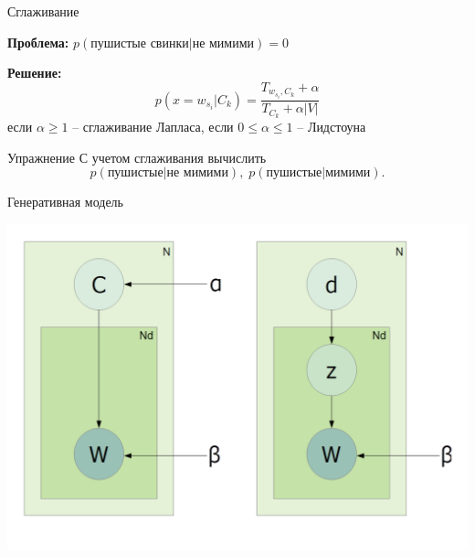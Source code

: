 \documentclass[aspectratio=169]{beamer}
\begin{document}
\begin{frame}{Сглаживание}

{\bf Проблема:} $p(\text{пушистые свинки}|\text{не мимими}) = 0$

\vspace{1em}
{\bf Решение:}
\[
p(x = w_{s_i} | C_k) = \frac{T_{w_{s_i}, C_k} + \alpha}{T_{C_k} + \alpha |V|}
\]
если $\alpha \geq 1$ -- сглаживание Лапласа, если $0 \leq \alpha \leq 1$ -- Лидстоуна

\vspace{1em}
\begin{exampleblock}{Упражнение}
С учетом сглаживания вычислить 
\[
p(\text{пушистые}|\text{не мимими}), \; p(\text{пушистые}|\text{мимими}).
\]
\end{exampleblock}

\end{frame}


\begin{frame}{Генеративная модель}

\begin{center}
\includegraphics[scale=0.3]{images/lsa.png}
\end{center}

\end{frame}

\end{document}
